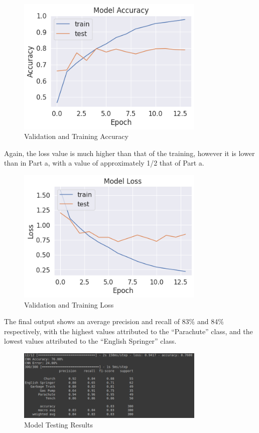 \begin{figure}[H]
	\centering
	\includegraphics[width=0.8\textwidth]{images/q1/pb/accuracy}
	\caption{Validation and Training Accuracy}
	\label{fig:q1pbacc}
\end{figure}

Again, the loss value is much higher than that of the training, however it is
lower than in Part a, with a value of approximately 1/2 that of Part a.

\begin{figure}[H]
	\centering
	\includegraphics[width=0.8\textwidth]{images/q1/pb/loss}
	\caption{Validation and Training Loss}
	\label{fig:q1pbloss}
\end{figure}

The final output shows an average precision and recall of 83\% and 84\%
respectively, with the highest
values attributed to the ``Parachute'' class, and the lowest values attributed
to the ``English Springer'' class.

\begin{figure}[H]
	\centering
	\includegraphics[width=0.8\textwidth]{images/q1/pb/results}
	\caption{Model Testing Results}
	\label{fig:q1pbResults}
\end{figure}

